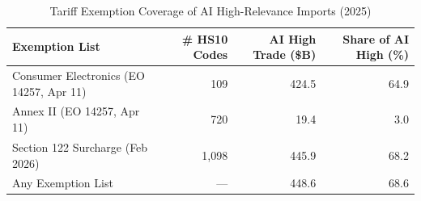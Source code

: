 \begin{table}[htbp]
\centering
\caption{Tariff Exemption Coverage of AI High-Relevance Imports (2025)}
\label{tab:exemption_coverage}
\setlength{\tabcolsep}{1.mm}
\renewcommand{\arraystretch}{1.60}
\begin{tabular}{lrrr}
\toprule
Exemption List & \# HS10 Codes & AI High Trade (\$B) & Share of AI High (\%) \\
\midrule
Consumer Electronics (EO 14257, Apr 11) & 109 & 424.5 & 64.9 \\
Annex II (EO 14257, Apr 11) & 720 & 19.4 & 3.0 \\
Section 122 Surcharge (Feb 2026) & 1,098 & 445.9 & 68.2 \\
\midrule
Any Exemption List & --- & 448.6 & 68.6 \\
\bottomrule
\end{tabular}
\end{table}
